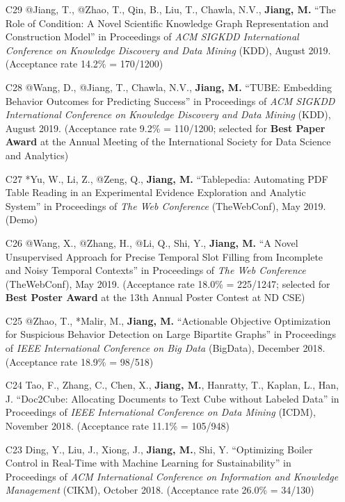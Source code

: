 \documentclass[10pt]{article}
\newenvironment{myindentpar}[1]%
{\begin{list}{}%
         {\setlength{\leftmargin}{#1}}%
         \item[]%
}
{\end{list}}
\newcounter{list}
\begin{document}
\begin{myindentpar}{0.00cm}
\begin{enumerate}[leftmargin=.5cm]
\item[C29] @Jiang, T., @Zhao, T., Qin, B., Liu, T., Chawla, N.V., \textbf{Jiang, M.} ``The Role of Condition: A Novel Scientific Knowledge Graph Representation and Construction Model'' in Proceedings of \textit{ACM SIGKDD International Conference on Knowledge Discovery and Data Mining} (KDD), August 2019. (Acceptance rate 14.2\% = 170/1200)

\item[C28] @Wang, D., @Jiang, T., Chawla, N.V., \textbf{Jiang, M.} ``TUBE: Embedding Behavior Outcomes for Predicting Success'' in Proceedings of \textit{ACM SIGKDD International Conference on Knowledge Discovery and Data Mining} (KDD), August 2019. (Acceptance rate 9.2\% = 110/1200; selected for \textbf{Best Paper Award} at the Annual Meeting of the International Society for Data Science and Analytics)
	
\item[C27] *Yu, W., Li, Z., @Zeng, Q., \textbf{Jiang, M.} ``Tablepedia: Automating PDF Table Reading in an Experimental Evidence Exploration and Analytic System'' in Proceedings of \textit{The Web Conference} (TheWebConf), May 2019. (Demo)
	
\item[C26] @Wang, X., @Zhang, H., @Li, Q., Shi, Y., \textbf{Jiang, M.} ``A Novel Unsupervised Approach for Precise Temporal Slot Filling from Incomplete and Noisy Temporal Contexts'' in Proceedings of \textit{The Web Conference} (TheWebConf), May 2019. (Acceptance rate 18.0\% = 225/1247; selected for \textbf{Best Poster Award} at the 13th Annual Poster Contest at ND CSE)

\item[C25] @Zhao, T., *Malir, M., \textbf{Jiang, M.} ``Actionable Objective Optimization for Suspicious Behavior Detection on Large Bipartite Graphs'' in Proceedings of \textit{IEEE International Conference on Big Data} (BigData), December 2018. (Acceptance rate 18.9\% = 98/518)

\item[C24] Tao, F., Zhang, C., Chen, X., \textbf{Jiang, M.}, Hanratty, T., Kaplan, L., Han, J. ``Doc2Cube: Allocating Documents to Text Cube without Labeled Data'' in Proceedings of \textit{IEEE International Conference on Data Mining} (ICDM), November 2018. (Acceptance rate 11.1\% = 105/948)

\item[C23] Ding, Y., Liu, J., Xiong, J., \textbf{Jiang, M.}, Shi, Y. ``Optimizing Boiler Control in Real-Time with Machine Learning for Sustainability'' in Proceedings of \textit{ACM International Conference on Information and Knowledge Management} (CIKM), October 2018. (Acceptance rate 26.0\% = 34/130)


\end{enumerate}
\end{myindentpar}
\end{document}
